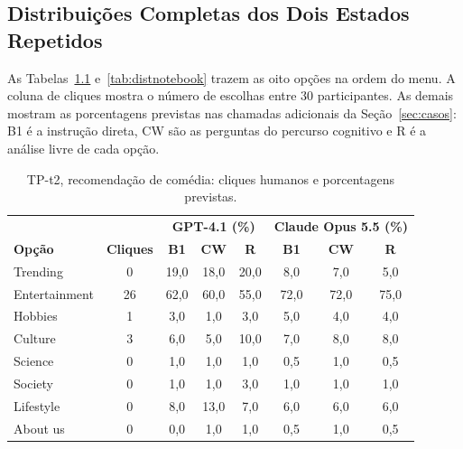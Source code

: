 \documentclass[12pt,oneside,a4paper,chapter=TITLE,english,brazil]{abntex2}
\begin{document}
\begin{apendicesenv}
\chapter{Distribuições Completas dos Dois Estados Repetidos}
\label{ap:distribuicoes}

As Tabelas~\ref{tab:distcomedia} e~\ref{tab:distnotebook} trazem as oito opções na ordem do menu. A coluna de cliques mostra o número de escolhas entre 30 participantes. As demais mostram as porcentagens previstas nas chamadas adicionais da Seção~\ref{sec:casos}: B1 é a instrução direta, CW são as perguntas do percurso cognitivo e R é a análise livre de cada opção.

\begin{table}[htb]
\centering
\caption{TP-t2, recomendação de comédia: cliques humanos e porcentagens previstas.}
\label{tab:distcomedia}
\footnotesize
\begin{tabular}{@{}lccccccc@{}}
\toprule
 & & \multicolumn{3}{c}{\textbf{GPT-4.1 (\%)}} & \multicolumn{3}{c}{\textbf{Claude Opus 5.5 (\%)}} \\
\textbf{Opção} & \textbf{Cliques} & \textbf{B1} & \textbf{CW} & \textbf{R} & \textbf{B1} & \textbf{CW} & \textbf{R} \\
\midrule
Trending & 0 & 19,0 & 18,0 & 20,0 & 8,0 & 7,0 & 5,0 \\
Entertainment & 26 & 62,0 & 60,0 & 55,0 & 72,0 & 72,0 & 75,0 \\
Hobbies & 1 & 3,0 & 1,0 & 3,0 & 5,0 & 4,0 & 4,0 \\
Culture & 3 & 6,0 & 5,0 & 10,0 & 7,0 & 8,0 & 8,0 \\
Science & 0 & 1,0 & 1,0 & 1,0 & 0,5 & 1,0 & 0,5 \\
Society & 0 & 1,0 & 1,0 & 3,0 & 1,0 & 1,0 & 1,0 \\
Lifestyle & 0 & 8,0 & 13,0 & 7,0 & 6,0 & 6,0 & 6,0 \\
About us & 0 & 0,0 & 1,0 & 1,0 & 0,5 & 1,0 & 0,5 \\
\bottomrule
\end{tabular}
\end{table}


\end{apendicesenv}
\end{document}
